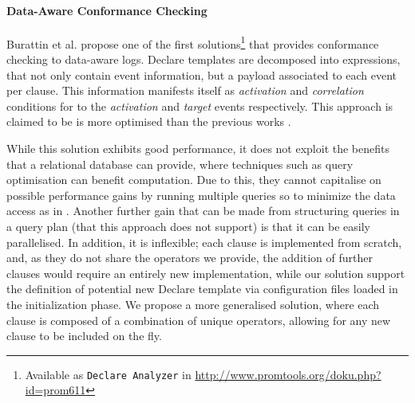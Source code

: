 \paragraph*{Data-Aware Conformance Checking}
Burattin et al. \cite{BurattinMS16} propose one of the first solutions\footnote{Available as \texttt{Declare Analyzer} in \url{http://www.promtools.org/doku.php?id=prom611}} that provides conformance checking to data-aware logs. Declare templates are decomposed into \LTLf expressions, that not only contain event information, but a payload associated to each event per clause. This information manifests itself as \emph{activation} and \emph{correlation} conditions for to the \emph{activation} and \emph{target} events respectively. This approach is claimed to be is more optimised than the previous works \cite{VanDerAalst2005}.%

While this solution exhibits good performance, it does not exploit the benefits that a relational database can provide, where techniques such as query optimisation can benefit computation. Due to this, they cannot capitalise on possible performance gains by running multiple queries so to minimize the data access as in \cite{BellatrecheKB21}. Another further gain that can be made from structuring queries in a query plan (that this approach does not support) is that it can be easily parallelised. In addition, it is inflexible; each clause is implemented from scratch, and, as they do not share the operators we provide, the addition of further clauses would require an entirely new implementation, while our solution support the definition of potential new Declare template via configuration files loaded in the initialization phase. We propose a more generalised solution, where each clause is composed of a combination of unique operators, allowing for any new clause to be included on the fly. 


